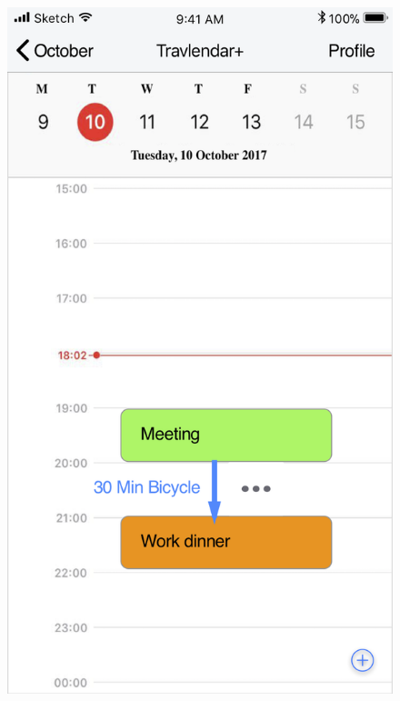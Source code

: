 \begin{enumerate}
			\begin{figure}[H]
				\centering
				\includegraphics[scale=0.25]{Images/Sketch/Event_View_1}
				\hspace{0.5cm}

\end{figure}
\end{enumerate}
